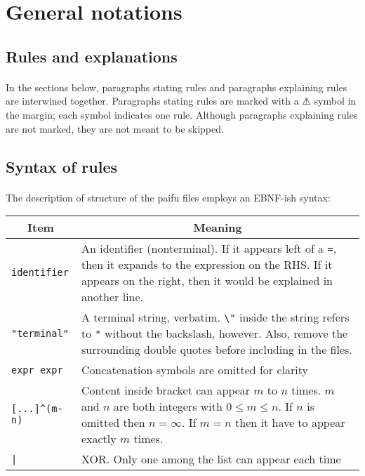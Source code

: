 \documentclass[%
	a4paper%
	,10pt%
	,twoside%
	,notitlepage%
]{article}%
\newcommand*{\ruleSymbol}{\textjapanese{⚠}}%
\begin{document}
\section{General notations}\label{sec:gen}%
% 
	\subsection{Rules and explanations}\label{subsec:rule}%
		\paragraph*{}In the sections below, paragraphs stating rules and paragraphs explaining rules are interwined together. Paragraphs stating rules are marked with a \ruleSymbol{} symbol in the margin; each symbol indicates one rule. Although paragraphs explaining rules are not marked, they are not meant to be skipped. %
	\subsection{Syntax of rules}\label{subsec:syntax}%
		\paragraph*{}The description of structure of the paifu files employs an EBNF-ish syntax: %
		\begin{center}\begin{tabular}{|l|p{}|}\hline%
			\multicolumn{1}{|c|}{Item}&\multicolumn{1}{c|}{Meaning}\\\hline%
			\lstinline[classoffset=1,morekeywords={identifier}]/identifier/&An identifier (nonterminal). \newline%
				If it appears left of a \lstinline/=/, then it expands to the expression on the RHS. \newline%
				If it appears on the right, then it would be explained in another line. \\\hline%
			\lstinline/"terminal"/&A terminal string, verbatim. \newline%
				\verb|\"| inside the string refers to \verb|"| without the backslash, however. \newline%
				Also, remove the surrounding double quotes before including in the files. \\\hline%
			\lstinline/expr expr/&Concatenation symbols are omitted for clarity\\\hline%
			\lstinline/[...]^(m-n)/&Content inside bracket can appear $m$ to $n$ times. \newline%
				$m$ and $n$ are both integers with $0 \le m \le n$. \newline%
				If $n$ is omitted then $n=\infty$. \newline%
				If $m=n$ then it have to appear exactly $m$ times. \\\hline%
			\lstinline/|/&XOR. Only one among the list can appear each time\\\hline%
		\end{tabular}\end{center}%
\end{document}
